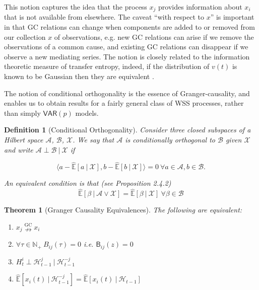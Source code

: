\documentclass{statsoc}
\def\ngc{\overset{\text{GC}}{\nrightarrow}}  %
\def\VAR{\mathsf{VAR}}  %
\def\B{\mathsf{B}}  %
\def\H{\mathcal{H}}  %
\newcommand{\linE}[2]{\hat{\E}[#1\ |\ #2]}  %
\newtheorem{theorem}{Theorem}
\newtheorem{definition}{Definition}
\def\H{\mathcal{H}}  %
\def\E{\mathbb{E}}  %
\def\N{\mathbb{N}}  %
\newcommand{\inner}[2]{\langle #1, #2 \rangle}  %
\begin{document}
This notion captures the idea that the process $x_j$ provides
information about $x_i$ that is not available from elsewhere.  The
caveat ``with respect to $x$'' is important in that GC relations can
change when components are added to or removed from our collection $x$
of observations, e.g. new GC relations can arise if we remove the
observations of a common cause, and existing GC relations can
disappear if we observe a new mediating series. The notion is closely
related to the information theoretic measure of transfer entropy,
indeed, if the distribution of $v(t)$ is known to be Gaussian then
they are equivalent \cite{barnett2009granger}.

The notion of conditional orthogonality is the essence of
Granger-causality, and enables us to obtain results for a fairly
general class of WSS processes, rather than simply $\VAR(p)$ models.

\begin{definition}[Conditional Orthogonality]
  \label{lem:conditional_orthogonality_equivalence}
  Consider three closed subspaces of a Hilbert space $\mathcal{A}$,
  $\mathcal{B}$, $\mathcal{X}$.  We say that $\mathcal{A}$ is
  conditionally orthogonal to $\mathcal{B}$ given $\mathcal{X}$
  and write $\mathcal{A} \perp \mathcal{B}\ |\ \mathcal{X}$ if

    \begin{equation*}
      \inner{a - \linE{a}{\mathcal{X}}}{b - \linE{b}{\mathcal{X}}} = 0\ \forall a \in \mathcal{A}, b \in \mathcal{B}.
    \end{equation*}

  An equivalent condition is that (see \cite{lindquist} Proposition 2.4.2)
  \begin{equation*}
    \linE{\beta}{\mathcal{A} \vee \mathcal{X}} = \linE{\beta}{\mathcal{X}}\ \forall \beta \in \mathcal{B}
  \end{equation*}
\end{definition}

\begin{theorem}[Granger Causality Equivalences]
  \label{thm:granger_causality_equivalences}
  The following are equivalent:

  \begin{enumerate}
    \item{$x_j \ngc x_i$}
    \item{$\forall \tau \in \N_+\ B_{ij}(\tau) = 0$ i.e. $\B_{ij}(z) = 0$}
    \item{$H_t^{i} \perp \H_{t - 1}^{j}\ |\ \H_{t - 1}^{-j}$}
    \item{$\linE{x_i(t)}{\H_{t - 1}^{-j}} = \linE{x_i(t)}{\H_{t - 1}}$}
  \end{enumerate}
\end{theorem}
\end{document}
